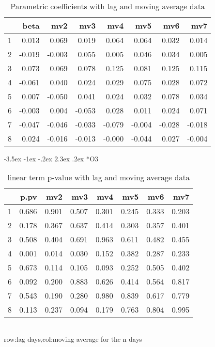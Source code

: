\documentclass[a4paper, 12pt]{article}
\makeatletter
\def\large{\fontsize{14}{20}\selectfont}
\renewcommand\subsection{\@startsection {subsection}{1}{\z@}%
                                   {-3.5ex \@plus -1ex \@minus -.2ex}%
                                   {2.3ex \@plus.2ex}%
                                   {\centering\normalfont\large\bfseries}}
\makeatother
\begin{document}
\begin{table}[h]
\centering
\caption{Parametric coefficients with lag and moving average data}
\begin{tabular}{rrrrrrrr}
  \hline
 & beta & mv2 & mv3 & mv4 & mv5 & mv6 & mv7 \\
  \hline
1 & 0.013 & 0.069 & 0.019 & 0.064 & 0.064 & 0.032 & 0.014 \\
  2 & -0.019 & -0.003 & 0.055 & 0.005 & 0.046 & 0.034 & 0.005 \\
  3 & 0.073 & 0.069 & 0.078 & 0.125 & 0.081 & 0.125 & 0.115 \\
  4 & -0.061 & 0.040 & 0.024 & 0.029 & 0.075 & 0.028 & 0.072 \\
  5 & 0.007 & -0.050 & 0.041 & 0.024 & 0.032 & 0.078 & 0.034 \\
  6 & -0.003 & 0.004 & -0.053 & 0.028 & 0.011 & 0.024 & 0.071 \\
  7 & -0.047 & -0.046 & -0.033 & -0.079 & -0.004 & -0.028 & -0.018 \\
  8 & 0.024 & -0.016 & -0.013 & -0.000 & -0.044 & 0.027 & -0.004 \\
   \hline
\end{tabular}
\end{table}
\clearpage
\subsection*{O3}
\begin{table}[h]
\centering
\caption{linear term p-value with lag and moving average data}
\begin{tabular}{rrrrrrrr}
  \hline
 & p.pv & mv2 & mv3 & mv4 & mv5 & mv6 & mv7 \\
  \hline
1 & 0.686 & 0.901 & 0.507 & 0.301 & 0.245 & 0.333 & 0.203 \\
  2 & 0.178 & 0.367 & 0.637 & 0.414 & 0.303 & 0.357 & 0.401 \\
  3 & 0.508 & 0.404 & 0.691 & 0.963 & 0.611 & 0.482 & 0.455 \\
  4 & 0.001 & 0.014 & 0.030 & 0.152 & 0.382 & 0.287 & 0.233 \\
  5 & 0.673 & 0.114 & 0.105 & 0.093 & 0.252 & 0.505 & 0.402 \\
  6 & 0.092 & 0.200 & 0.883 & 0.626 & 0.414 & 0.564 & 0.817 \\
  7 & 0.543 & 0.190 & 0.280 & 0.980 & 0.839 & 0.617 & 0.779 \\
  8 & 0.113 & 0.237 & 0.094 & 0.179 & 0.763 & 0.804 & 0.995 \\
   \hline
\end{tabular}
\\row:lag days,col:moving average for the n days
\end{table}
\end{document}
